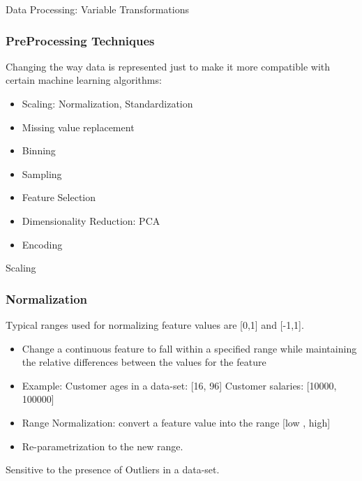 	


\begin{frame}
  \begin{center}
    {\Large Data Processing: Variable Transformations}
  \end{center}
\end{frame}



\begin{frame}[fragile]\frametitle{PreProcessing Techniques}
Changing the way data is represented just to make it more compatible with certain machine learning algorithms:

\begin{itemize}
\item Scaling: Normalization, Standardization 
\item Missing value replacement
\item Binning 
\item Sampling 
\item Feature Selection
\item Dimensionality Reduction: PCA
\item Encoding
\end{itemize}
\end{frame}


\begin{frame}
  \begin{center}
    {\Large Scaling}
  \end{center}
\end{frame}

\begin{frame}[fragile]\frametitle{Normalization}	
Typical ranges used for normalizing feature values are [0,1] and [-1,1].

\begin{itemize}
\item Change a continuous feature to fall within a specified range while maintaining the relative differences between the values for the feature
\item Example:
Customer ages in a data-set: [16, 96]
Customer salaries: [10000, 100000]
\item Range Normalization: convert a feature value into the range [low , high] 
\item Re-parametrization to the new range.
\end{itemize}
Sensitive to the presence of Outliers in a data-set.
\end{frame}

